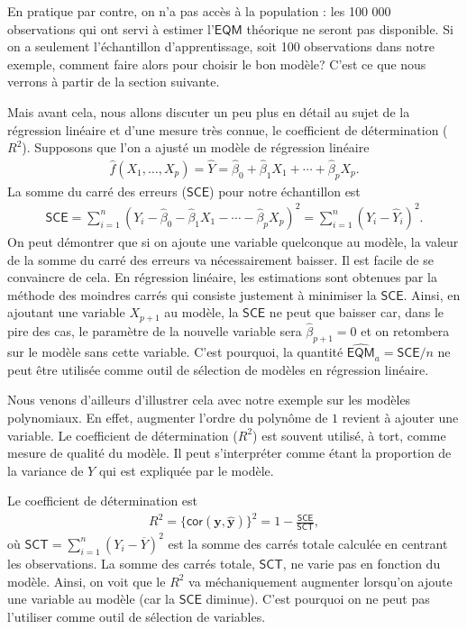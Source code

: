 \documentclass[
  11pt,
  letterpaper,
]{book}
\theoremstyle{definition}
\theoremstyle{definition}
\theoremstyle{definition}
\theoremstyle{definition}
\theoremstyle{remark}
\begin{document}
En pratique par contre, on n'a pas accès à la population : les 100 000 observations qui ont servi à estimer l'\(\mathsf{EQM}\) théorique ne seront pas disponible. Si on a seulement l'échantillon d'apprentissage, soit 100 observations dans notre exemple, comment faire alors pour choisir le bon modèle? C'est ce que nous verrons à partir de la section suivante.

Mais avant cela, nous allons discuter un peu plus en détail au sujet de la régression linéaire et d'une mesure très connue, le coefficient de détermination (\(R^2\)). Supposons que l'on a ajusté un modèle de régression linéaire
\begin{align*}
\widehat{f}(X_1, \ldots, X_p) = \widehat{Y}=\widehat{\beta}_0 + \widehat{\beta}_1X_1+ \cdots + \widehat{\beta}_p X_p.
\end{align*}
La somme du carré des erreurs (\(\mathsf{SCE}\)) pour notre échantillon est
\begin{align*}
\mathsf{SCE}=\sum_{i=1}^n (Y_i - \widehat{\beta}_0 - \widehat{\beta}_1X_1 - \cdots - \widehat{\beta}_p X_p)^2 = \sum_{i=1}^n (Y_i-\widehat{Y}_i)^2.
 \end{align*}
On peut démontrer que si on ajoute une variable quelconque au modèle, la valeur de la somme du carré des erreurs va nécessairement baisser. Il est facile de se convaincre de cela. En régression linéaire, les estimations sont obtenues par la méthode des moindres carrés qui consiste justement à minimiser la \(\mathsf{SCE}\). Ainsi, en ajoutant une variable \(X_{p+1}\) au modèle, la \(\mathsf{SCE}\) ne peut que baisser car, dans le pire des cas, le paramètre de la nouvelle variable sera \(\widehat{\beta}_{p+1}=0\) et on retombera sur le modèle sans cette variable. C'est pourquoi, la quantité \(\widehat{\mathsf{EQM}}_a=\mathsf{SCE}/n\) ne peut être utilisée comme outil de sélection de modèles en régression linéaire.

Nous venons d'ailleurs d'illustrer cela avec notre exemple sur les modèles polynomiaux. En effet, augmenter l'ordre du polynôme de \(1\) revient à ajouter une variable. Le coefficient de détermination (\(R^2\)) est souvent utilisé, à tort, comme mesure de qualité du modèle. Il peut s'interpréter comme étant la proportion de la variance de \(Y\) qui est expliquée par le modèle.

Le coefficient de détermination est
\begin{align*}
R^2=\{\mathsf{cor}(\boldsymbol{y}, \widehat{\boldsymbol{y}})\}^2 = 1-\frac{\mathsf{SCE}}{\mathsf{SCT}},
\end{align*}
où \(\mathsf{SCT}=\sum_{i=1}^n (Y_i-\overline{Y})^2\) est la somme des carrés totale calculée en centrant les observations. La somme des carrés totale, \(\mathsf{SCT}\), ne varie pas en fonction du modèle.
Ainsi, on voit que le \(R^2\) va méchaniquement augmenter lorsqu'on ajoute une variable au modèle (car la \(\mathsf{SCE}\) diminue). C'est pourquoi on ne peut pas l'utiliser comme outil de sélection de variables.
\end{document}
